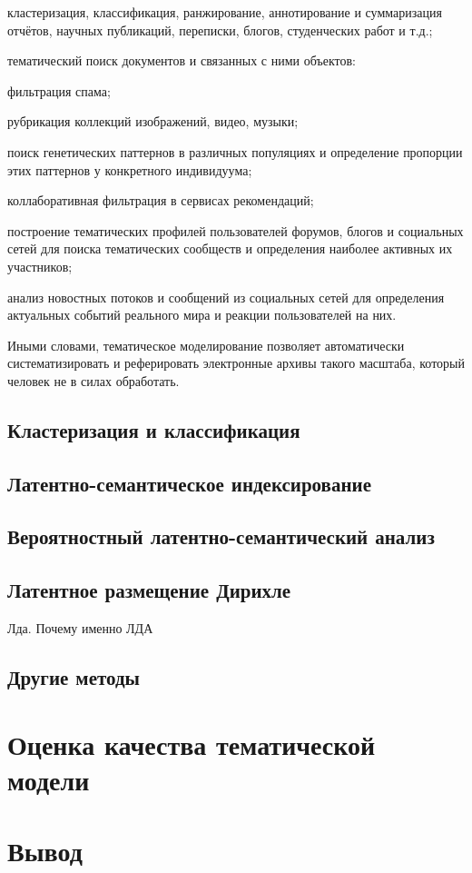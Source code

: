 \begin{itemize*}
\item кластеризация, классификация, ранжирование, аннотирование и суммаризация отчётов, научных публикаций, переписки, блогов, студенческих работ и т.д.; 
\item тематический поиск документов и связанных с ними объектов: 
\item фильтрация спама; 
\item рубрикация коллекций изображений, видео, музыки; 
\item поиск генетических паттернов в различных популяциях и определение пропорции этих паттернов у конкретного индивидуума; 
\item коллаборативная фильтрация в сервисах рекомендаций;
\item построение тематических профилей пользователей форумов, блогов и социальных сетей для поиска тематических сообществ и определения наиболее активных их участников; 
\item анализ новостных потоков и сообщений из социальных сетей для определения актуальных событий реального мира и реакции пользователей на них.
\end{itemize*}

Иными словами, тематическое моделирование позволяет автоматически систематизировать и реферировать электронные архивы такого масштаба, который человек не в силах обработать.


\subsection{Кластеризация и классификация}
\subsection{Латентно-семантическое индексирование}
\subsection{Вероятностный латентно-семантический анализ}
\subsection{Латентное размещение Дирихле}

Лда. Почему именно ЛДА

\subsection{Другие методы}


\section{Оценка качества тематической модели}
\label{sec:tm_techniques}


\section{Вывод}
\label{sec:overview_concl}

\blindtext